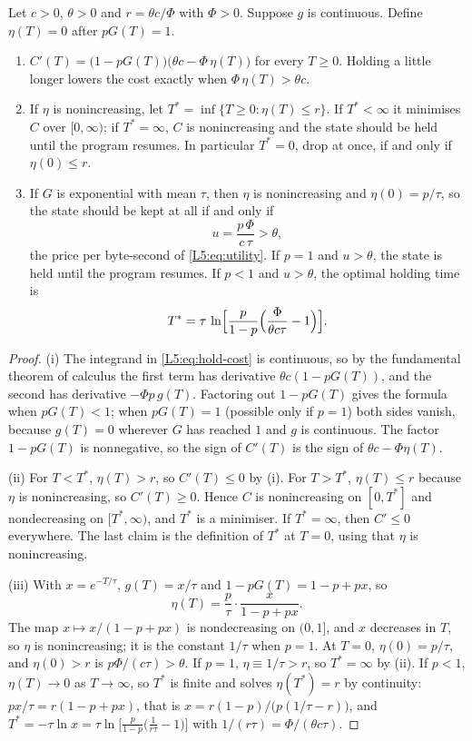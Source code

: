 \begin{proposition}\label{L5:prop:hold}
Let $c>0$, $\theta>0$ and $r=\theta c/\Phi$ with $\Phi>0$.
Suppose $g$ is continuous. Define $\eta(T)=0$ after $pG(T)=1$.
\begin{enumerate}[label=(\roman*)]
\item $C'(T)=\bigl(1-pG(T)\bigr)\bigl(\theta c-\Phi\,\eta(T)\bigr)$ for every $T\ge0$.
  Holding a little longer lowers the cost exactly when $\Phi\,\eta(T)>\theta c$.
\item If $\eta$ is nonincreasing, let $T^*=\inf\{T\ge0:\eta(T)\le r\}$. If
  $T^*<\infty$ it minimises $C$ over $[0,\infty)$; if $T^*=\infty$, $C$ is nonincreasing
  and the state should be held until the program resumes. In particular $T^*=0$, drop at
  once, if and only if $\eta(0)\le r$.
\item If $G$ is exponential with mean $\tau$, then $\eta$ is nonincreasing and
  $\eta(0)=p/\tau$, so the state should be kept at all if and only if
  \[
    u=\frac{p\,\Phi}{c\,\tau}>\theta ,
  \]
  the price per byte-second of \eqref{L5:eq:utility}. If $p=1$ and $u>\theta$, the
  state is held until the program resumes. If $p<1$ and $u>\theta$, the optimal holding
  time is
  \[
    T^*=\tau\,\ln\Bigl[\frac{p}{1-p}\Bigl(\frac{\Phi}{\theta c\tau}-1\Bigr)\Bigr].
  \]
\end{enumerate}
\end{proposition}

\begin{proof}
(i) The integrand in \eqref{L5:eq:hold-cost} is continuous, so by the fundamental
theorem of calculus the first term has derivative $\theta c(1-pG(T))$, and the second
has derivative $-\Phi p\,g(T)$. Factoring out $1-pG(T)$ gives the formula when
$pG(T)<1$; when $pG(T)=1$ (possible only if $p=1$) both sides vanish, because
$g(T)=0$ wherever $G$ has reached $1$ and $g$ is continuous. The factor $1-pG(T)$ is
nonnegative, so the sign of $C'(T)$ is the sign of $\theta c-\Phi\eta(T)$.

(ii) For $T<T^*$, $\eta(T)>r$, so $C'(T)\le0$ by (i). For $T>T^*$, $\eta(T)\le r$
because $\eta$ is nonincreasing, so $C'(T)\ge0$. Hence $C$ is nonincreasing on
$[0,T^*]$ and nondecreasing on $[T^*,\infty)$, and $T^*$ is a minimiser. If
$T^*=\infty$, then $C'\le0$ everywhere. The last claim is the definition of $T^*$ at
$T=0$, using that $\eta$ is nonincreasing.

(iii) With $x=e^{-T/\tau}$, $g(T)=x/\tau$ and $1-pG(T)=1-p+px$, so
\[
  \eta(T)=\frac{p}{\tau}\cdot\frac{x}{1-p+px}.
\]
The map $x\mapsto x/(1-p+px)$ is nondecreasing on $(0,1]$, and $x$ decreases in $T$,
so $\eta$ is nonincreasing; it is the constant $1/\tau$ when $p=1$. At $T=0$,
$\eta(0)=p/\tau$, and $\eta(0)>r$ is $p\Phi/(c\tau)>\theta$. If $p=1$, $\eta\equiv1/\tau>r$,
so $T^*=\infty$ by (ii). If $p<1$, $\eta(T)\to0$ as $T\to\infty$, so $T^*$ is finite and
solves $\eta(T^*)=r$ by continuity:
$px/\tau=r(1-p+px)$, that is $x=r(1-p)/\bigl(p(1/\tau-r)\bigr)$, and
$T^*=-\tau\ln x=\tau\ln\bigl[\frac{p}{1-p}\bigl(\frac{1}{r\tau}-1\bigr)\bigr]$ with
$1/(r\tau)=\Phi/(\theta c\tau)$.
\end{proof}

